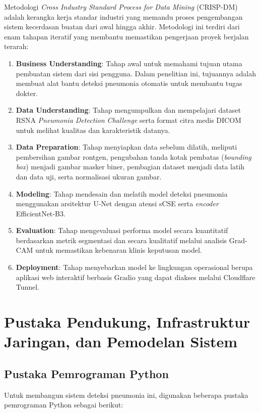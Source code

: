\documentclass[12pt,a4paper,oneside]{book}
\begin{document}
Metodologi \textit{Cross Industry Standard Process for Data Mining} (CRISP-DM) adalah kerangka kerja standar industri yang memandu proses pengembangan sistem kecerdasan buatan dari awal hingga akhir. Metodologi ini terdiri dari enam tahapan iteratif yang membantu memastikan pengerjaan proyek berjalan terarah:

\begin{enumerate}
  \item \textbf{Business Understanding}: Tahap awal untuk memahami tujuan utama pembuatan sistem dari sisi pengguna. Dalam penelitian ini, tujuannya adalah membuat alat bantu deteksi pneumonia otomatis untuk membantu tugas dokter.
  \item \textbf{Data Understanding}: Tahap mengumpulkan dan mempelajari dataset RSNA \textit{Pneumonia Detection Challenge} serta format citra medis DICOM untuk melihat kualitas dan karakteristik datanya.
  \item \textbf{Data Preparation}: Tahap menyiapkan data sebelum dilatih, meliputi pembersihan gambar rontgen, pengubahan tanda kotak pembatas (\textit{bounding box}) menjadi gambar masker biner, pembagian dataset menjadi data latih dan data uji, serta normalisasi ukuran gambar.
  \item \textbf{Modeling}: Tahap mendesain dan melatih model deteksi pneumonia menggunakan arsitektur U-Net dengan atensi sCSE serta \textit{encoder} EfficientNet-B3.
  \item \textbf{Evaluation}: Tahap mengevaluasi performa model secara kuantitatif berdasarkan metrik segmentasi dan secara kualitatif melalui analisis Grad-CAM untuk memastikan kebenaran klinis keputusan model.
  \item \textbf{Deployment}: Tahap menyebarkan model ke lingkungan operasional berupa aplikasi web interaktif berbasis Gradio yang dapat diakses melalui Cloudflare Tunnel.
\end{enumerate}


\section{Pustaka Pendukung, Infrastruktur Jaringan, dan Pemodelan Sistem}

\subsection{Pustaka Pemrograman Python}

Untuk membangun sistem deteksi pneumonia ini, digunakan beberapa pustaka pemrograman Python sebagai berikut:
\end{document}
